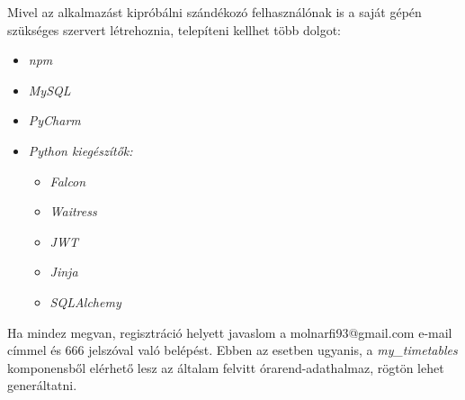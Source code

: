 Mivel az alkalmazást kipróbálni szándékozó felhasználónak is a saját gépén szükséges szervert létrehoznia, telepíteni kellhet több dolgot:
\begin{itemize}
	\item \textit{npm}
	\item \textit{MySQL}
	\item \textit{PyCharm}
	\item \textit{Python kiegészítők:}
	\begin{itemize}
		\item \textit{Falcon}
		\item \textit{Waitress}
		\item \textit{JWT}
		\item \textit{Jinja}
		\item \textit{SQLAlchemy}
	\end{itemize}
\end{itemize}

Ha mindez megvan, regisztráció helyett javaslom a molnarfi93@gmail.com e-mail címmel és 666 jelszóval való belépést. Ebben az esetben ugyanis, a \textit{my\_timetables} komponensből elérhető lesz az általam felvitt órarend-adathalmaz, rögtön lehet generáltatni.

